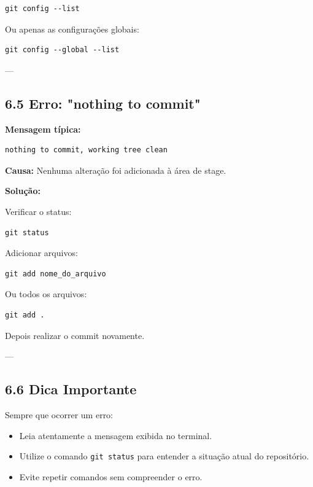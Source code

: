 \documentclass[12pt,a4paper]{article}
\begin{document}
\begin{verbatim}
git config --list
\end{verbatim}

Ou apenas as configurações globais:

\begin{verbatim}
git config --global --list
\end{verbatim}

---

\subsection*{6.5 Erro: "nothing to commit"}

\textbf{Mensagem típica:}

\begin{verbatim}
nothing to commit, working tree clean
\end{verbatim}

\textbf{Causa:}  
Nenhuma alteração foi adicionada à área de stage.

\textbf{Solução:}

Verificar o status:

\begin{verbatim}
git status
\end{verbatim}

Adicionar arquivos:

\begin{verbatim}
git add nome_do_arquivo
\end{verbatim}

Ou todos os arquivos:

\begin{verbatim}
git add .
\end{verbatim}

Depois realizar o commit novamente.

---

\subsection*{6.6 Dica Importante}

Sempre que ocorrer um erro:
\begin{itemize}
    \item Leia atentamente a mensagem exibida no terminal.
    \item Utilize o comando \texttt{git status} para entender a situação atual do repositório.
    \item Evite repetir comandos sem compreender o erro.
\end{itemize}
\end{document}
